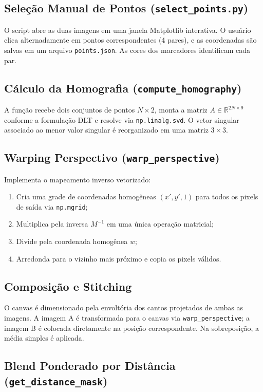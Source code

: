 \documentclass[12pt,a4paper]{article}
\begin{document}
\subsection{Seleção Manual de Pontos (\texttt{select\_points.py})}

O script abre as duas imagens em uma janela Matplotlib interativa. O usuário clica
alternadamente em pontos correspondentes (4 pares), e as coordenadas são salvas em um
arquivo \texttt{points.json}. As cores dos marcadores identificam cada par.

\subsection{Cálculo da Homografia (\texttt{compute\_homography})}

A função recebe dois conjuntos de pontos $N\times2$, monta a matriz
$A\in\mathbb{R}^{2N\times9}$ conforme a formulação DLT e resolve via
\texttt{np.linalg.svd}. O vetor singular associado ao menor valor singular é
reorganizado em uma matriz $3\times3$.

\subsection{Warping Perspectivo (\texttt{warp\_perspective})}

Implementa o mapeamento inverso vetorizado:
\begin{enumerate}
  \item Cria uma grade de coordenadas homogêneas $(x',y',1)$ para todos os pixels de
        saída via \texttt{np.mgrid};
  \item Multiplica pela inversa $M^{-1}$ em uma única operação matricial;
  \item Divide pela coordenada homogênea $w$;
  \item Arredonda para o vizinho mais próximo e copia os pixels válidos.
\end{enumerate}

\subsection{Composição e Stitching}

O canvas é dimensionado pela envoltória dos cantos projetados de ambas as imagens. A
imagem A é transformada para o canvas via \texttt{warp\_perspective}; a imagem B é
colocada diretamente na posição correspondente. Na sobreposição, a média simples é
aplicada.

\subsection{Blend Ponderado por Distância (\texttt{get\_distance\_mask})}
\end{document}
